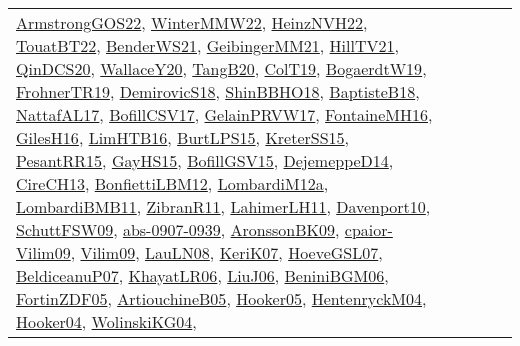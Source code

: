 {\begin{longtable}{lp{3cm}>{\raggedright}p{6cm}>{\raggedright}p{6cm}p{8cm}}
\href{papers/ArmstrongGOS22.pdf}{ArmstrongGOS22}\cite{ArmstrongGOS22}, \href{papers/WinterMMW22.pdf}{WinterMMW22}\cite{WinterMMW22}, \href{articles/HeinzNVH22.pdf}{HeinzNVH22}\cite{HeinzNVH22}, \href{papers/TouatBT22.pdf}{TouatBT22}\cite{TouatBT22}, \href{papers/BenderWS21.pdf}{BenderWS21}\cite{BenderWS21}, \href{papers/GeibingerMM21.pdf}{GeibingerMM21}\cite{GeibingerMM21}, \href{papers/HillTV21.pdf}{HillTV21}\cite{HillTV21}, \href{articles/QinDCS20.pdf}{QinDCS20}\cite{QinDCS20}, \href{articles/WallaceY20.pdf}{WallaceY20}\cite{WallaceY20}, \href{papers/TangB20.pdf}{TangB20}\cite{TangB20}, \href{papers/ColT19.pdf}{ColT19}\cite{ColT19}, \href{papers/BogaerdtW19.pdf}{BogaerdtW19}\cite{BogaerdtW19}, \href{papers/FrohnerTR19.pdf}{FrohnerTR19}\cite{FrohnerTR19}, \href{papers/DemirovicS18.pdf}{DemirovicS18}\cite{DemirovicS18}, \href{articles/ShinBBHO18.pdf}{ShinBBHO18}\cite{ShinBBHO18}, \href{articles/BaptisteB18.pdf}{BaptisteB18}\cite{BaptisteB18}, \href{articles/NattafAL17.pdf}{NattafAL17}\cite{NattafAL17}, \href{papers/BofillCSV17.pdf}{BofillCSV17}\cite{BofillCSV17}, \href{papers/GelainPRVW17.pdf}{GelainPRVW17}\cite{GelainPRVW17}, \href{papers/FontaineMH16.pdf}{FontaineMH16}\cite{FontaineMH16}, \href{papers/GilesH16.pdf}{GilesH16}\cite{GilesH16}, \href{papers/LimHTB16.pdf}{LimHTB16}\cite{LimHTB16}, \href{papers/BurtLPS15.pdf}{BurtLPS15}\cite{BurtLPS15}, \href{papers/KreterSS15.pdf}{KreterSS15}\cite{KreterSS15}, \href{papers/PesantRR15.pdf}{PesantRR15}\cite{PesantRR15}, \href{papers/GayHS15.pdf}{GayHS15}\cite{GayHS15}, \href{papers/BofillGSV15.pdf}{BofillGSV15}\cite{BofillGSV15}, \href{papers/DejemeppeD14.pdf}{DejemeppeD14}\cite{DejemeppeD14}, \href{papers/CireCH13.pdf}{CireCH13}\cite{CireCH13}, \href{papers/BonfiettiLBM12.pdf}{BonfiettiLBM12}\cite{BonfiettiLBM12}, \href{articles/LombardiM12a.pdf}{LombardiM12a}\cite{LombardiM12a}, \href{papers/LombardiBMB11.pdf}{LombardiBMB11}\cite{LombardiBMB11}, \href{papers/ZibranR11.pdf}{ZibranR11}\cite{ZibranR11}, \href{papers/LahimerLH11.pdf}{LahimerLH11}\cite{LahimerLH11}, \href{papers/Davenport10.pdf}{Davenport10}\cite{Davenport10}, \href{papers/SchuttFSW09.pdf}{SchuttFSW09}\cite{SchuttFSW09}, \href{articles/abs-0907-0939.pdf}{abs-0907-0939}\cite{abs-0907-0939}, \href{papers/AronssonBK09.pdf}{AronssonBK09}\cite{AronssonBK09}, \href{papers/cpaior-Vilim09.pdf}{cpaior-Vilim09}\cite{cpaior-Vilim09}, \href{papers/Vilim09.pdf}{Vilim09}\cite{Vilim09}, \href{papers/LauLN08.pdf}{LauLN08}\cite{LauLN08}, \href{papers/KeriK07.pdf}{KeriK07}\cite{KeriK07}, \href{papers/HoeveGSL07.pdf}{HoeveGSL07}\cite{HoeveGSL07}, \href{papers/BeldiceanuP07.pdf}{BeldiceanuP07}\cite{BeldiceanuP07}, \href{articles/KhayatLR06.pdf}{KhayatLR06}\cite{KhayatLR06}, \href{papers/LiuJ06.pdf}{LiuJ06}\cite{LiuJ06}, \href{papers/BeniniBGM06.pdf}{BeniniBGM06}\cite{BeniniBGM06}, \href{papers/FortinZDF05.pdf}{FortinZDF05}\cite{FortinZDF05}, \href{papers/ArtiouchineB05.pdf}{ArtiouchineB05}\cite{ArtiouchineB05}, \href{articles/Hooker05.pdf}{Hooker05}\cite{Hooker05}, \href{papers/HentenryckM04.pdf}{HentenryckM04}\cite{HentenryckM04}, \href{papers/Hooker04.pdf}{Hooker04}\cite{Hooker04}, \href{papers/WolinskiKG04.pdf}{WolinskiKG04}\cite{WolinskiKG04}, 
\end{longtable}}
